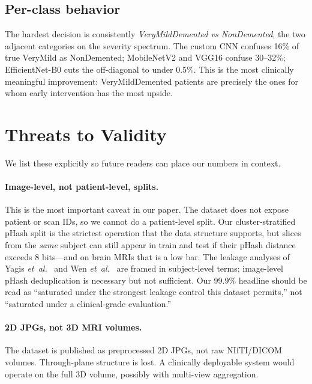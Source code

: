 \documentclass[journal,onecolumn,11pt]{IEEEtran}
\begin{document}
\subsection{Per-class behavior}

The hardest decision is consistently \textit{VeryMildDemented vs NonDemented},
the two adjacent categories on the severity spectrum. The custom CNN
confuses 16\% of true VeryMild as NonDemented; MobileNetV2 and VGG16 confuse
30--32\%; EfficientNet-B0 cuts the off-diagonal to under 0.5\%. This is the
most clinically meaningful improvement: VeryMildDemented patients are precisely
the ones for whom early intervention has the most upside.

\section{Threats to Validity}
\label{sec:threats}

We list these explicitly so future readers can place our numbers in context.

\paragraph{Image-level, not patient-level, splits.}
This is the most important caveat in our paper. The dataset does not expose
patient or scan IDs, so we cannot do a patient-level split. Our
cluster-stratified pHash split is the strictest operation that the data
structure supports, but slices from the \emph{same} subject can still appear
in train and test if their pHash distance exceeds 8 bits---and on
brain MRIs that is a low bar. The leakage analyses of Yagis
\textit{et~al.}~\cite{yagis2021leakage} and Wen
\textit{et~al.}~\cite{wen2020adcnn} are framed in subject-level terms;
image-level pHash deduplication is necessary but not sufficient. Our 99.9\% headline
should be read as ``saturated under the strongest leakage control this
dataset permits,'' not ``saturated under a clinical-grade evaluation.''

\paragraph{2D JPGs, not 3D MRI volumes.}
The dataset is published as preprocessed 2D JPGs, not raw NIfTI/DICOM
volumes. Through-plane structure is lost. A clinically deployable system
would operate on the full 3D volume, possibly with multi-view aggregation.
\end{document}
